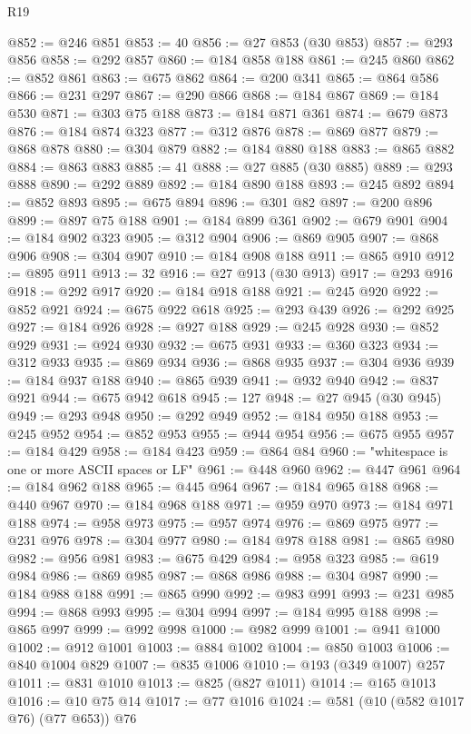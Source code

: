 \begin{lexlean}{R19}
\begin{coremodule}
@852 := @246 @851
@853 := 40
@856 := @27 @853 (@30 @853)
@857 := @293 @856
@858 := @292 @857
@860 := @184 @858 @188
@861 := @245 @860
@862 := @852 @861
@863 := @675 @862
@864 := @200 @341
@865 := @864 @586
@866 := @231 @297
@867 := @290 @866
@868 := @184 @867
@869 := @184 @530
@871 := @303 @75 @188
@873 := @184 @871 @361
@874 := @679 @873
@876 := @184 @874 @323
@877 := @312 @876
@878 := @869 @877
@879 := @868 @878
@880 := @304 @879
@882 := @184 @880 @188
@883 := @865 @882
@884 := @863 @883
@885 := 41
@888 := @27 @885 (@30 @885)
@889 := @293 @888
@890 := @292 @889
@892 := @184 @890 @188
@893 := @245 @892
@894 := @852 @893
@895 := @675 @894
@896 := @301 @82
@897 := @200 @896
@899 := @897 @75 @188
@901 := @184 @899 @361
@902 := @679 @901
@904 := @184 @902 @323
@905 := @312 @904
@906 := @869 @905
@907 := @868 @906
@908 := @304 @907
@910 := @184 @908 @188
@911 := @865 @910
@912 := @895 @911
@913 := 32
@916 := @27 @913 (@30 @913)
@917 := @293 @916
@918 := @292 @917
@920 := @184 @918 @188
@921 := @245 @920
@922 := @852 @921
@924 := @675 @922 @618
@925 := @293 @439
@926 := @292 @925
@927 := @184 @926
@928 := @927 @188
@929 := @245 @928
@930 := @852 @929
@931 := @924 @930
@932 := @675 @931
@933 := @360 @323
@934 := @312 @933
@935 := @869 @934
@936 := @868 @935
@937 := @304 @936
@939 := @184 @937 @188
@940 := @865 @939
@941 := @932 @940
@942 := @837 @921
@944 := @675 @942 @618
@945 := 127
@948 := @27 @945 (@30 @945)
@949 := @293 @948
@950 := @292 @949
@952 := @184 @950 @188
@953 := @245 @952
@954 := @852 @953
@955 := @944 @954
@956 := @675 @955
@957 := @184 @429
@958 := @184 @423
@959 := @864 @84
@960 := "whitespace is one or more ASCII spaces or LF"
@961 := @448 @960
@962 := @447 @961
@964 := @184 @962 @188
@965 := @445 @964
@967 := @184 @965 @188
@968 := @440 @967
@970 := @184 @968 @188
@971 := @959 @970
@973 := @184 @971 @188
@974 := @958 @973
@975 := @957 @974
@976 := @869 @975
@977 := @231 @976
@978 := @304 @977
@980 := @184 @978 @188
@981 := @865 @980
@982 := @956 @981
@983 := @675 @429
@984 := @958 @323
@985 := @619 @984
@986 := @869 @985
@987 := @868 @986
@988 := @304 @987
@990 := @184 @988 @188
@991 := @865 @990
@992 := @983 @991
@993 := @231 @985
@994 := @868 @993
@995 := @304 @994
@997 := @184 @995 @188
@998 := @865 @997
@999 := @992 @998
@1000 := @982 @999
@1001 := @941 @1000
@1002 := @912 @1001
@1003 := @884 @1002
@1004 := @850 @1003
@1006 := @840 @1004 @829
@1007 := @835 @1006
@1010 := @193 (@349 @1007) @257
@1011 := @831 @1010
@1013 := @825 (@827 @1011)
@1014 := @165 @1013
@1016 := @10 @75 @14
@1017 := @77 @1016
@1024 := @581 (@10 (@582 @1017 @76) (@77 @653)) @76

\end{coremodule}
\end{lexlean}
